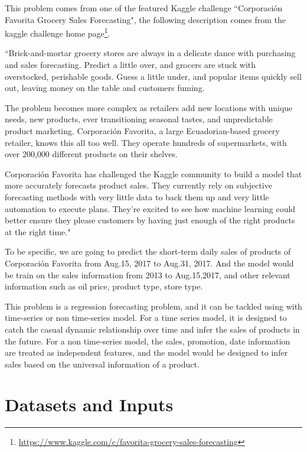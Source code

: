 \documentclass{article}
\begin{document}
\newcommand{\urldescription}{https://www.kaggle.com/c/favorita-grocery-sales-forecasting}

This problem comes from one of the featured Kaggle challenge ``Corporación Favorita Grocery Sales Forecasting", the following description comes from the kaggle challenge home page\footnote{\url{\urldescription}}.

``Brick-and-mortar grocery stores are always in a delicate dance with purchasing and sales forecasting. Predict a little over, and grocers are stuck with overstocked, perishable goods. Guess a little under, and popular items quickly sell out, leaving money on the table and customers fuming.

The problem becomes more complex as retailers add new locations with unique needs, new products, ever transitioning seasonal tastes, and unpredictable product marketing. Corporación Favorita, a large Ecuadorian-based grocery retailer, knows this all too well. They operate hundreds of supermarkets, with over 200,000 different products on their shelves.

Corporación Favorita has challenged the Kaggle community to build a model that more accurately forecasts product sales. They currently rely on subjective forecasting methods with very little data to back them up and very little automation to execute plans. They’re excited to see how machine learning could better ensure they please customers by having just enough of the right products at the right time."

To be specific, we are going to predict the short-term daily sales of products of Corporación Favorita from Aug.15, 2017 to Aug.31, 2017. And the model would be train on the sales information from 2013 to Aug.15,2017, and other relevant information such as oil price, product type, store type. 

This problem is a regression forecasting problem, and it can be tackled using with time-series or non time-series model. For a time series model, it is designed to catch the casual dynamic relationship over time and infer the sales of products in the future. For a non time-series model, the sales, promotion, date information are treated as independent features, and the model would be designed to infer sales based on the universal information of a product. 


\section{Datasets and Inputs}
\end{document}
